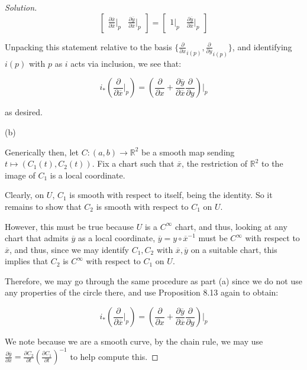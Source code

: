 \documentclass[10pt]{article}
\theoremstyle{nonumberplain}%
\begin{document}
\begin{proof}[Solution]
$$\begin{bmatrix} \frac{\partial \overline{x}}{\partial \overline{x}}\bigg|_p & \frac{\partial \overline{y}}{\partial \overline{x}}\bigg|_p \end{bmatrix} = \begin{bmatrix} 1\bigg|_p & \frac{\partial \overline{y}}{\partial \overline{x}}\bigg|_p \end{bmatrix} $$

Unpacking this statement relative to the basis $\{ \frac{\partial}{\partial x}_{i(p)}, \frac{\partial}{\partial y}_{i(p)} \}$, and identifying $i(p)$ with $p$ as $i$ acts via inclusion, we see that:

$$i_* \left( \frac{\partial}{\partial \overline{x}} \bigg|_p \right) = \left( \frac{\partial}{\partial x} + \frac{\partial \overline{y}}{\partial \overline{x}} \frac{\partial}{\partial y} \right)\bigg|_p$$

as desired. 

(b)

Generically then, let $C: (a,b) \to \mathbb{R}^2$ be a smooth map sending $t \mapsto (C_1(t), C_2(t))$. Fix a chart such that $\overline{x}$, the restriction of $\mathbb{R}^2$ to the image of $C_1$ is a local coordinate.

Clearly, on $U$, $C_1$ is smooth with respect to itself, being the identity. So it remains to show that $C_2$ is smooth with respect to $C_1$ on $U$.

However, this must be true because $U$ is a $C^\infty$ chart, and thus, looking at any chart that admits $\overline{y}$ as a local coordinate, $\overline{y} = y \circ \overline{x}^{-1}$ must be $C^\infty$ with respect to $\overline{x}$, and thus, since we may identify $C_1, C_2$ with $\overline{x}, \overline{y}$ on a suitable chart, this implies that $C_2$ is $C^\infty$ with respect to $C_1$ on $U$.

Therefore, we may go through the same procedure as part (a) since we do not use any properties of the circle there, and use Proposition 8.13 again to obtain:

$$i_* \left( \frac{\partial}{\partial \overline{x}} \bigg|_p \right) = \left( \frac{\partial}{\partial x} + \frac{\partial \overline{y}}{\partial \overline{x}} \frac{\partial}{\partial y} \right)\bigg|_p$$

We note because we are a smooth curve, by the chain rule, we may use $\frac{\partial \overline{y}}{\partial \overline{x}} = \frac{\partial C_2}{\partial t} \left( \frac{\partial C_1}{\partial t} \right)^{-1}$ to help compute this.

\end{proof}
\end{document}
